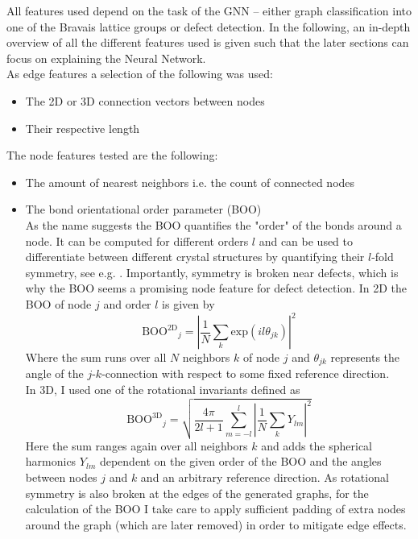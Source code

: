 \documentclass[11pt,a4paper]{article}
\begin{document}
All features used depend on the task of the GNN -- either graph classification into one of the Bravais lattice groups or defect detection. 
In the following, an in-depth overview of all the different features used is given such that the later sections can focus on explaining the Neural Network. \\
As edge features a selection of the following was used: 
\begin{itemize}
\item The 2D or 3D connection vectors between nodes
\item Their respective length
\end{itemize}
The node features tested are the following:
\begin{itemize}
\item The amount of nearest neighbors i.e. the count of connected nodes
\item The bond orientational order parameter (BOO)\\
As the name suggests the BOO quantifies the "order" of the bonds around a node. 
It can be computed for different orders $l$ and can be used to differentiate between different crystal structures by quantifying their $l$-fold symmetry, see e.g. \cite{boo3d}. 
Importantly, symmetry is broken near defects, which is why the BOO seems a promising node feature for defect detection. 
In 2D the BOO of node $j$ and order $l$ is given by \cite{boo2d}
\begin{equation}
\label{eq:boo2d}
\mathrm{BOO^{2D}}_j = \left|\frac{1}{N} \sum_k \mathrm{exp}(il\theta_{jk}) \right|^2
\end{equation}
Where the sum runs over all $N$ neighbors $k$ of node $j$ and $\theta_{jk}$ represents the angle of the $j$-$k$-connection with respect to some fixed reference direction. \\
In 3D, I used one of the rotational invariants defined as \cite{boo3d}
\begin{equation}
\mathrm{BOO^{3D}}_j = \sqrt{\frac{4\pi}{2l+1} \sum_{m=-l}^{l} \left| \frac{1}{N} \sum_k Y_{lm}\right|^2}
\end{equation} 
Here the sum ranges again over all neighbors $k$ and adds the spherical harmonics $Y_{lm}$ dependent on the given order of the BOO and the angles between nodes $j$ and $k$ and an arbitrary reference direction. 
As rotational symmetry is also broken at the edges of the generated graphs, for the calculation of the BOO I take care to apply sufficient padding of extra nodes around the graph (which are later removed) in order to mitigate edge effects. 
\end{itemize}
\end{document}

